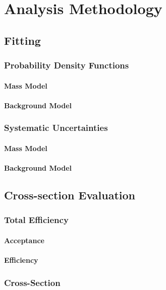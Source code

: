 \chapter[\leavevmode\newline Analysis Methodology]{Analysis Methodology}
\label{chap:Chapter_4}
\section{Fitting}
\subsection{Probability Density Functions}
\subsubsection{Mass Model}
\subsubsection{Background Model}
\subsection{Systematic Uncertainties}
\subsubsection{Mass Model}
\subsubsection{Background Model}
\section{Cross-section Evaluation}
\subsection{Total Efficiency}
\subsubsection{Acceptance}

\subsubsection{Efficiency}
\subsection{Cross-Section}
\lipsum[4]